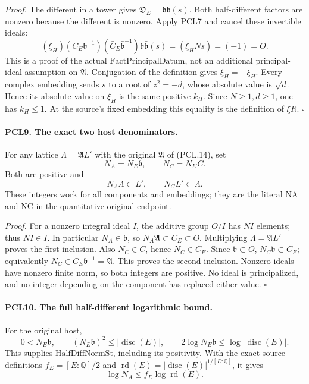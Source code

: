 \documentclass[11pt,a4paper]{article}
\numberwithin{equation}{section}
\theoremstyle{remark}\newtheorem{remark}[theorem]{Remark}
\begin{document}
\emph{Proof.}
The different in a tower gives
\(\mathfrak D_E=\mathfrak b\bar{\mathfrak b}(s)\).
Both half-different factors are nonzero because the
different is nonzero.  Apply PCL7 and cancel these
invertible ideals:
\[
 (\xi_H)(C_E\mathfrak b^{-1})
       (\bar C_E\bar{\mathfrak b}^{-1})
       \mathfrak b\bar{\mathfrak b}(s)
       =(\xi_H Ns)=(-1)=O.                          \tag{PCL.16}
\]
This is a proof of the actual \(\mathrm{FactPrincipalDatum}\),
not an additional principal-ideal assumption on
\(\mathfrak A\).  Conjugation of the definition gives
\(\bar\xi_H=-\xi_H\).  Every complex embedding sends
\(s\) to a root of \(z^2=-d\), whose absolute value is
\(\sqrt d\).  Hence its absolute value on \(\xi_H\)
is the same positive \(k_H\).  Since \(N\ge1,d\ge1\),
one has \(k_H\le1\).  At the source's fixed embedding
this equality is the definition of \(\xi R\).
\hfill\(\square\)

\paragraph{PCL9. The exact two host denominators.}
\label{claim:PCL9}
For any lattice \(\Lambda=\mathfrak A L'\) with the
original \(\mathfrak A\) of (PCL.14), set
\[
             N_A=N_E\mathfrak b,
             \qquad N_C=N_K C.                     \tag{PCL.17}
\]
Both are positive and
\[
               N_A\Lambda\subset L',\qquad
                           N_C L'\subset\Lambda.    \tag{PCL.18}
\]
These integers work for all components and embeddings;
they are the literal \(\mathrm{NA}\) and \(\mathrm{NC}\)
in the quantitative original endpoint.

\emph{Proof.}
For a nonzero integral ideal \(I\), the additive group
\(O/I\) has \(NI\) elements; thus \(NI\in I\).
In particular \(N_A\in\mathfrak b\), so
\(N_A\mathfrak A\subset C_E\subset O\).  Multiplying
\(\Lambda=\mathfrak A L'\) proves the first inclusion.
Also \(N_C\in C\), hence \(N_C\in C_E\).
Since \(\mathfrak b\subset O\),
\(N_C\mathfrak b\subset C_E\); equivalently
\(N_C\in C_E\mathfrak b^{-1}=\mathfrak A\).
This proves the second inclusion.  Nonzero ideals have
nonzero finite norm, so both integers are positive.
No ideal is principalized, and no integer depending on
the component has replaced either value.
\hfill\(\square\)

\paragraph{PCL10. The full half-different logarithmic bound.}
\label{claim:PCL10}
For the original host,
\[
 0<N_E\mathfrak b,\qquad
 (N_E\mathfrak b)^2\le|\operatorname{disc}(E)|,
 \qquad
 2\log N_E\mathfrak b\le\log|\operatorname{disc}(E)|.
                                                               \tag{PCL.19}
\]
This supplies \(\mathrm{HalfDiffNormSt}\), including its
positivity.  With the exact source definitions
\(f_E=[E:\mathbb Q]/2\) and
\(\operatorname{rd}(E)=|\operatorname{disc}(E)|^{1/[E:\mathbb Q]}\),
it gives
\[
        \log N_A\le f_E\log\operatorname{rd}(E).     \tag{PCL.20}
\]
\end{document}
